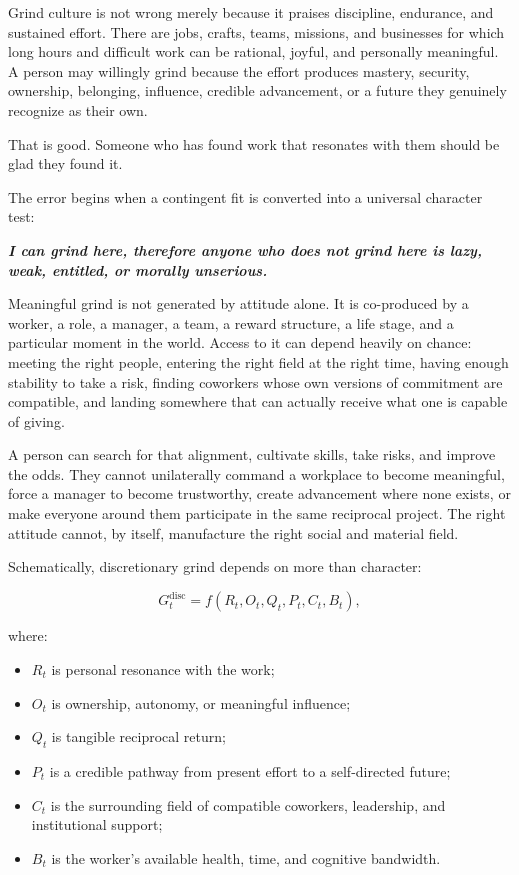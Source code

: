 \documentclass[11pt,oneside]{article}
\providecommand{\tightlist}{%
  \setlength{\itemsep}{0.22em}\setlength{\parskip}{0pt}}
\renewenvironment{quote}
  {\begin{tcolorbox}[
      enhanced,
      breakable,
      colback=ManifestLight,
      colframe=ManifestRule,
      boxrule=0pt,
      leftrule=3pt,
      arc=0pt,
      outer arc=0pt,
      left=10pt,right=10pt,top=8pt,bottom=8pt,
      before skip=0.8em,after skip=0.8em
    ]\itshape}
  {\end{tcolorbox}}
\begin{document}
Grind culture is not wrong merely because it praises discipline,
endurance, and sustained effort. There are jobs, crafts, teams,
missions, and businesses for which long hours and difficult work can be
rational, joyful, and personally meaningful. A person may willingly
grind because the effort produces mastery, security, ownership,
belonging, influence, credible advancement, or a future they genuinely
recognize as their own.

That is good. Someone who has found work that resonates with them should
be glad they found it.

The error begins when a contingent fit is converted into a universal
character test:

\begin{quote}
\textbf{I can grind here, therefore anyone who does not grind here is
lazy, weak, entitled, or morally unserious.}
\end{quote}

Meaningful grind is not generated by attitude alone. It is co-produced
by a worker, a role, a manager, a team, a reward structure, a life
stage, and a particular moment in the world. Access to it can depend
heavily on chance: meeting the right people, entering the right field at
the right time, having enough stability to take a risk, finding
coworkers whose own versions of commitment are compatible, and landing
somewhere that can actually receive what one is capable of giving.

A person can search for that alignment, cultivate skills, take risks,
and improve the odds. They cannot unilaterally command a workplace to
become meaningful, force a manager to become trustworthy, create
advancement where none exists, or make everyone around them participate
in the same reciprocal project. The right attitude cannot, by itself,
manufacture the right social and material field.

Schematically, discretionary grind depends on more than character:

\[
G_t^{\mathrm{disc}}
=
f(R_t,O_t,Q_t,P_t,C_t,B_t),
\]

where:

\begin{itemize}
\tightlist
\item
  \(R_t\) is personal resonance with the work;
\item
  \(O_t\) is ownership, autonomy, or meaningful influence;
\item
  \(Q_t\) is tangible reciprocal return;
\item
  \(P_t\) is a credible pathway from present effort to a self-directed
  future;
\item
  \(C_t\) is the surrounding field of compatible coworkers, leadership,
  and institutional support;
\item
  \(B_t\) is the worker's available health, time, and cognitive
  bandwidth.
\end{itemize}
\end{document}
